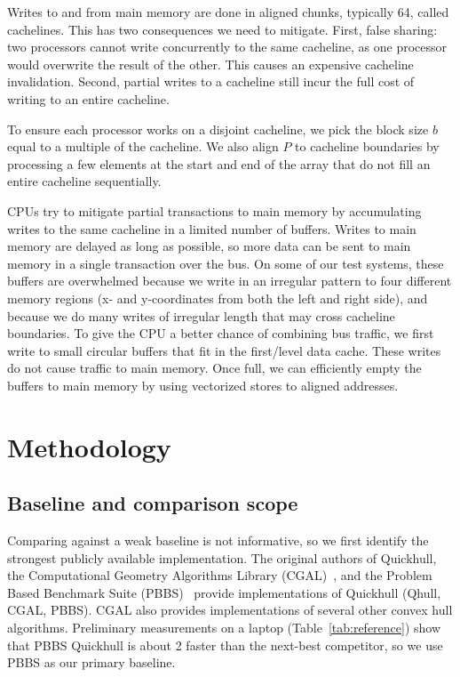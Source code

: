 Writes to and from main memory are done in aligned chunks, typically \qty{64}{\byte}, called cachelines.
This has two consequences we need to mitigate.
First, false sharing: two processors cannot write concurrently to the same cacheline, as one processor would overwrite the result of the other.
This causes an expensive cacheline invalidation.
Second, partial writes to a cacheline still incur the full cost of writing to an entire cacheline.

To ensure each processor works on a disjoint cacheline, we pick the block size $b$ equal to a multiple of the cacheline.
We also align $P$ to cacheline boundaries by processing a few elements at the start and end of the array that do not fill an entire cacheline sequentially.

CPUs try to mitigate partial transactions to main memory by accumulating writes to the same cacheline in a limited number of buffers.
Writes to main memory are delayed as long as possible, so more data can be sent to main memory in a single transaction over the bus.
On some of our test systems, these buffers are overwhelmed because we write in an irregular pattern to four different memory regions (x- and y-coordinates from both the left and right side), and because we do many writes of irregular length that may cross cacheline boundaries.
To give the CPU a better chance of combining bus traffic, we first write to small circular buffers that fit in the first\-/level data cache.
These writes do not cause traffic to main memory.
Once full, we can efficiently empty the buffers to main memory by using vectorized stores to aligned addresses.

\section{Methodology}\label{sec:methodology}

\subsection{Baseline and comparison scope}
Comparing against a weak baseline is not informative, so we first identify the strongest publicly available implementation.
The original authors of Quickhull, the Computational Geometry Algorithms Library (CGAL)~\cite{cgal2024manual}, and the
Problem Based Benchmark Suite (PBBS)~\cite{anderson2022problem} provide implementations of Quickhull (Qhull, CGAL, PBBS).
CGAL also provides implementations of several other convex hull algorithms.
Preliminary measurements on a laptop (Table~\ref{tab:reference}) show that PBBS Quickhull is about \qty{2}{\times} faster than the next-best competitor, so we use PBBS as our primary baseline.


